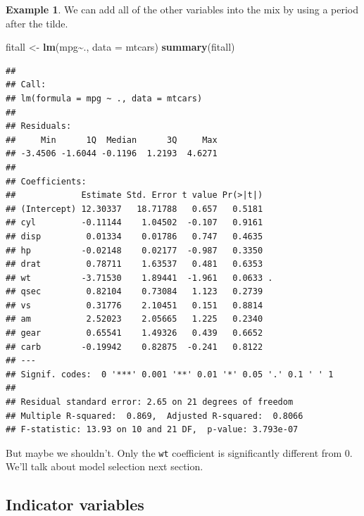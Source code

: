 \documentclass[
]{book}
\newenvironment{Shaded}{\begin{snugshade}}{\end{snugshade}}
\newcommand{\AttributeTok}[1]{\textcolor[rgb]{0.13,0.29,0.53}{#1}}
\newcommand{\FunctionTok}[1]{\textcolor[rgb]{0.13,0.29,0.53}{\textbf{#1}}}
\newcommand{\NormalTok}[1]{#1}
\newcommand{\OtherTok}[1]{\textcolor[rgb]{0.56,0.35,0.01}{#1}}
\newcommand{\SpecialCharTok}[1]{\textcolor[rgb]{0.81,0.36,0.00}{\textbf{#1}}}
\theoremstyle{definition}
\theoremstyle{definition}
\newtheorem{example}{Example}[chapter]
\theoremstyle{definition}
\theoremstyle{definition}
\theoremstyle{remark}
\begin{document}
\begin{examplebox}

\begin{example}
We can add all of the other variables into the mix by using a period after the tilde.

\begin{Shaded}
\begin{Highlighting}[]
\NormalTok{fitall }\OtherTok{\textless{}{-}} \FunctionTok{lm}\NormalTok{(mpg}\SpecialCharTok{\textasciitilde{}}\NormalTok{., }\AttributeTok{data =}\NormalTok{ mtcars)}
\FunctionTok{summary}\NormalTok{(fitall)}
\end{Highlighting}
\end{Shaded}

\begin{verbatim}
## 
## Call:
## lm(formula = mpg ~ ., data = mtcars)
## 
## Residuals:
##     Min      1Q  Median      3Q     Max 
## -3.4506 -1.6044 -0.1196  1.2193  4.6271 
## 
## Coefficients:
##             Estimate Std. Error t value Pr(>|t|)  
## (Intercept) 12.30337   18.71788   0.657   0.5181  
## cyl         -0.11144    1.04502  -0.107   0.9161  
## disp         0.01334    0.01786   0.747   0.4635  
## hp          -0.02148    0.02177  -0.987   0.3350  
## drat         0.78711    1.63537   0.481   0.6353  
## wt          -3.71530    1.89441  -1.961   0.0633 .
## qsec         0.82104    0.73084   1.123   0.2739  
## vs           0.31776    2.10451   0.151   0.8814  
## am           2.52023    2.05665   1.225   0.2340  
## gear         0.65541    1.49326   0.439   0.6652  
## carb        -0.19942    0.82875  -0.241   0.8122  
## ---
## Signif. codes:  0 '***' 0.001 '**' 0.01 '*' 0.05 '.' 0.1 ' ' 1
## 
## Residual standard error: 2.65 on 21 degrees of freedom
## Multiple R-squared:  0.869,  Adjusted R-squared:  0.8066 
## F-statistic: 13.93 on 10 and 21 DF,  p-value: 3.793e-07
\end{verbatim}

But maybe we shouldn't. Only the \texttt{wt} coefficient is significantly different from 0. We'll talk about model selection next section.
\end{example}

\end{examplebox}

\subsection*{Indicator variables}\label{indicator-variables}
\end{document}

